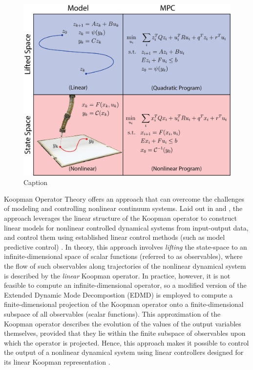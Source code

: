 \begin{figure}
    \centering
    \includegraphics[width=\linewidth]{figures/overview_v5_ph.png}
    \caption{Caption}
    \label{fig:overview}
\end{figure}


Koopman Operator Theory offers an approach that can overcome the challenges of modeling and controlling nonlinear continuum systems.
Laid out in \citet{mauroy2016linear} and \citet{korda2018linear}, the approach leverages the linear structure of the Koopman operator to construct linear models for nonlinear controlled dynamical systems from input-output data, and control them using established linear control methods (such as model predictive control) .
In theory, this approach involves \emph{lifting} the state-space to an infinite-dimensional space of scalar functions (referred to as observables), where the flow of such observables along trajectories of the nonlinear dynamical system is described by the \emph{linear} Koopman operator.
In practice, however, it is not feasible to compute an infinite-dimensional operator, so a modified version of the Extended Dynamic Mode Decompostion (EDMD) is employed to compute a finite-dimensional projection of the Koopman operator onto a finite-dimensional subspace of all observables (scalar functions).
This approximation of the Koopman operator describes the evolution of the values of the output variables themselves, provided that they lie within the finite subspace of observables upon which the operator is projected.
Hence, this approach makes it possible to control the output of a nonlinear dynamical system using linear controllers designed for its linear Koopman representation .

